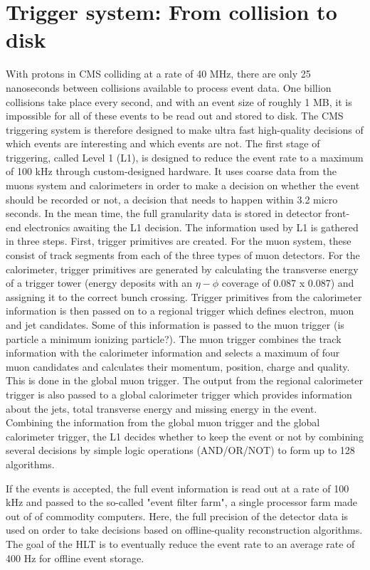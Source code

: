 \section{Trigger system: From collision to disk}

With protons in CMS colliding at a rate of 40 MHz, there are only 25 nanoseconds between collisions available to process event data. One billion collisions take place every second, and with an event size of roughly 1 MB, it is impossible for all of these events to be read out and stored to disk.
The CMS triggering system is therefore designed to make ultra fast high-quality decisions of which events are interesting and which events are not.
The first stage of triggering, called Level 1 (L1), is designed to reduce the event rate to a maximum of 100 kHz through custom-designed hardware. It uses coarse data from the muons system and calorimeters in order to make a decision on whether the event should be recorded or not, a decision that needs to happen within 3.2 micro seconds. In the mean time, the full granularity data is stored in detector front-end electronics awaiting the L1 decision.
The information used by L1 is gathered in three steps. First, trigger primitives are created. For the muon system, these consist of
track segments from each of the three types of muon detectors. For the calorimeter, trigger primitives are generated by
calculating the transverse energy of a trigger tower (energy deposits with an $\eta-\phi$ coverage of 0.087 x 0.087) and assigning it to the correct bunch crossing.
Trigger primitives from the calorimeter information is then passed on to a regional trigger which defines electron, muon and jet candidates. Some of this information is passed to the muon trigger (is particle a minimum ionizing particle?).
The muon trigger combines the track information with the calorimeter information and selects a maximum of four muon candidates and calculates their momentum, position, charge and quality. This is done in the global muon trigger.
The output from the regional calorimeter trigger is also passed to a global calorimeter trigger which provides information about the jets, total transverse energy and missing energy in the event.
Combining the information from the global muon trigger and the global calorimeter trigger, the L1 decides whether to keep the event or not by combining several decisions by simple logic operations (AND/OR/NOT) to form up to 128 algorithms.

If the events is accepted, the full event information is read out at a rate of 100 kHz and passed to the so-called "event filter farm", a single processor farm made out of of commodity computers. Here, the full precision of the detector data is used on order to take decisions based on offline-quality reconstruction algorithms. The goal of the HLT is to eventually reduce the event rate to an average rate of 400 Hz for offline event storage.

